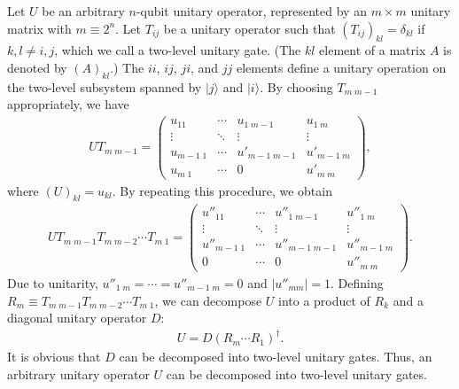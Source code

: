 Let $U$ be an arbitrary $n$-qubit unitary operator, represented by an $m\times m$ unitary matrix with $m\equiv 2^n$.
Let $T_{ij}$ be a unitary operator such that $(T_{ij})_{kl} = \delta _{kl}$ if $k,l \neq i,j$, which we call a two-level unitary gate.
(The $kl$ element of a matrix $A$ is denoted by $(A)_{kl}$.)
The $ii$, $ij$, $ji$, and $jj$ elements define a unitary operation on the two-level subsystem spanned by $|j\rangle$ and $|i\rangle$.
By choosing $T_{m\; m-1}$ appropriately, we have
\begin{eqnarray}
U T_{m \;m-1} = \left( 
\begin{array}{cccc}
	u_{11} & \cdots & u_{1\; m-1} & u_{1 \; m}
\\
	\vdots & \ddots & \vdots & \vdots
\\
	u_{m-1 \; 1} & \cdots & u'_{m-1 \; m-1} & u'_{m-1 \; m}
\\
	u_{m \; 1} & \cdots & 0  & u'_{m \; m}
\end{array}
\right),
\end{eqnarray}
where $(U)_{kl} = u_{kl}$.
By repeating this procedure, we obtain 
\begin{eqnarray}
U T_{m \; m-1} T_{m \; m-2} \cdots T_{m \; 1} 
= 
\left(
\begin{array}{cccc}
	u''_{11} & \cdots & u''_{1\; m-1} & u''_{1 \; m}
\\
	\vdots & \ddots & \vdots & \vdots
\\
	u''_{m-1 \; 1} & \cdots & u''_{m-1 \; m-1} & u''_{m-1 \; m}
\\
	0 & \cdots & 0  & u''_{m \; m}
\end{array}
\right).
\end{eqnarray}
Due to unitarity, $u'' _{1\;m}=\cdots = u''_{m-1 \; m}=0$ and $|u''_{mm}|=1$.
Defining $R_{m} \equiv T_{m \; m-1} T_{m \; m-2} \cdots T_{m \; 1} $, we can decompose $U$ into a product of $R_k$ and a diagonal unitary operator $D$:
\begin{eqnarray}
U= D (R_{m} \cdots R_1)^{\dag}.
\end{eqnarray}
It is obvious that $D$ can be decomposed into two-level unitary gates.
Thus, an arbitrary unitary operator $U$ can be decomposed into two-level unitary gates.

